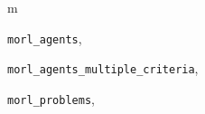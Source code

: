 \documentclass[letterpaper,10pt,english]{sphinxmanual}
\begin{document}
\renewcommand{\indexname}{Python Module Index}
\begin{theindex}
\def\bigletter#1{{\Large\sffamily#1}\nopagebreak\vspace{1mm}}
\bigletter{m}
\item {\texttt{morl\_agents}}, \pageref{Agents:module-morl_agents}
\item {\texttt{morl\_agents\_multiple\_criteria}}, \pageref{Agents:module-morl_agents_multiple_criteria}
\item {\texttt{morl\_problems}}, \pageref{Problems:module-morl_problems}
\end{theindex}

\renewcommand{\indexname}{Index}
\printindex
\end{document}

